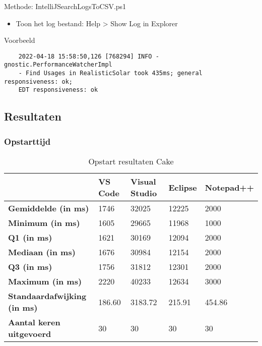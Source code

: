 Methode: IntelliJSearchLogsToCSV.ps1
\begin{itemize}
	\item Toon het log bestand: Help > Show Log in Explorer
\end{itemize}

Voorbeeld
\vspace{\verbatimOffset}
\begin{verbatim}
    2022-04-18 15:58:50,126 [768294] INFO - gnostic.PerformanceWatcherImpl
    - Find Usages in RealisticSolar took 435ms; general responsiveness: ok;
    EDT responsiveness: ok    
\end{verbatim}

\newpage

\subsection{Resultaten}
\subsubsection{Opstarttijd}

\begin{table}[h!]
	\centering
	\begin{tabular}{ l l l l l }
		\hline
		                                    & \textbf{VS Code} & \textbf{Visual Studio} & \textbf{Eclipse} & \textbf{Notepad++} \\
		\hline
		\textbf{Gemiddelde (in ms)}         & 1746             & 32025                  & 12225            & 2000               \\[1ex]

		\textbf{Minimum (in ms) }           & 1605             & 29665                  & 11968            & 1000               \\
		\textbf{Q1 (in ms)}                 & 1621             & 30169                  & 12094            & 2000               \\
		\textbf{Mediaan (in ms)}            & 1676             & 30984                  & 12154            & 2000               \\
		\textbf{Q3 (in ms)}                 & 1756             & 31812                  & 12301            & 2000               \\
		\textbf{Maximum (in ms)}            & 2220             & 40233                  & 12634            & 3000               \\[1ex]

		\textbf{Standaardafwijking (in ms)} & 186.60           & 3183.72                & 215.91           & 454.86             \\
		\textbf{Aantal keren uitgevoerd}    & 30               & 30                     & 30               & 30                 \\
		\hline
	\end{tabular}
	\caption{Opstart resultaten Cake}
	\label{tab:resultatenStartupCake}
\end{table}

